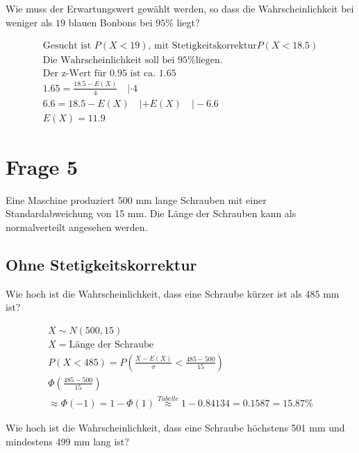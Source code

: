Wie muss der Erwartungswert gewählt werden, so dass die Wahrscheinlichkeit bei weniger als $19$ blauen Bonbons bei $95\%$ liegt?

\begin{align*}
    \text{Gesucht ist  } P(X < 19) \text{, mit Stetigkeitskorrektur} P(X < 18.5) \\
    \text{Die Wahrscheinlichkeit soll bei 95\% liegen.} \\
    \text{Der z-Wert für 0.95 ist ca. 1.65} \\
    1.65 = \frac{18.5 - E(X)}{4} \quad | \cdot 4  \\
    6.6 = 18.5 - E(X) \quad | +E(X) \quad | -6.6 \\
    E(X) = 11.9
\end{align*}

\section{Frage 5}

Eine Maschine produziert 500 mm lange Schrauben mit einer Standardabweichung von 15 mm. Die Länge der Schrauben kann als normalverteilt angesehen werden.

\subsection{Ohne Stetigkeitskorrektur}

Wie hoch ist die Wahrscheinlichkeit, dass eine Schraube kürzer ist als 485 mm ist?

\begin{align*}
    X \sim N(500, 15) \\
    X = \text{Länge der Schraube} \\
    P(X < 485) = P\left(\frac{X - E(X)}{\sigma} < \frac{485 - 500}{15}\right) \\
    \Phi\left(\frac{485 - 500}{15}\right) \\
    \approx \Phi(-1) = 1 - \Phi(1) \overset{Tabelle}{\approx} 1 - 0.84134 = 0.1587 = 15.87\%
\end{align*}

Wie hoch ist die Wahrscheinlichkeit, dass eine Schraube höchstens 501 mm und mindestens 499 mm lang ist?


